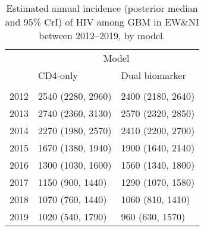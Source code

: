 \begin{table}[!h]
\centering\centering
\caption{\label{tab:incidence_annual}Estimated annual incidence (posterior median and 95\% CrI) of HIV among GBM in EW\&NI between 2012--2019, by model.}
\centering
\begin{tabular}[t]{rll}
\toprule
\multicolumn{1}{c}{ } & \multicolumn{2}{c}{Model} \\
\cmidrule(l{3pt}r{3pt}){2-3}
  & CD4-only & Dual biomarker\\
\midrule
\addlinespace[0.3em]
\multicolumn{3}{l}{Year}\\
\hspace{1em}2012 & 2540 (2280, 2960) & 2400 (2180, 2640)\\
\hspace{1em}2013 & 2740 (2360, 3130) & 2570 (2320, 2850)\\
\hspace{1em}2014 & 2270 (1980, 2570) & 2410 (2200, 2700)\\
\hspace{1em}2015 & 1670 (1380, 1940) & 1900 (1640, 2140)\\
\hspace{1em}2016 & 1300 (1030, 1600) & 1560 (1340, 1800)\\
\hspace{1em}2017 & 1150 (900, 1440) & 1290 (1070, 1580)\\
\hspace{1em}2018 & 1070 (760, 1440) & 1060 (810, 1410)\\
\hspace{1em}2019 & 1020 (540, 1790) & 960 (630, 1570)\\
\bottomrule
\end{tabular}
\end{table}
